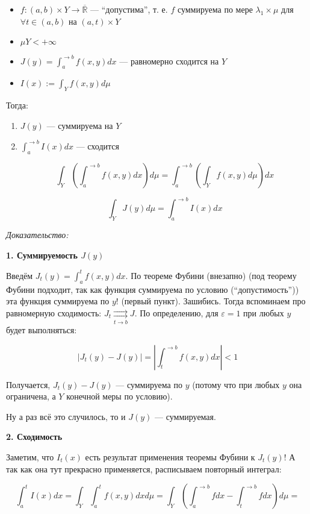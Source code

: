 \documentclass{article}
\def\rsh#1{\underset{#1}{\rightrightarrows}}
\def\rinf{\overline{\mathbb{R}}}
\begin{document}
\begin{itemize}
    \item $f: (a, b) \times Y \rightarrow \rinf$ --- ``допустима'', т. е. $f$ суммируема по мере $\lambda_1 \times \mu$ для $\forall t \in (a, b)$ на $(a, t) \times Y$ 
    \item $\mu Y < +\infty$
    \item $J(y) = \int_a^{\rightarrow b} f(x, y) dx$ --- равномерно сходится на $Y$
    \item $I(x) := \int_{Y} f(x, y) d\mu$
\end{itemize}

Тогда:

\begin{enumerate}
    \item $J(y)$ --- суммируема на $Y$
    \item $\int_a^{\rightarrow b} I(x) dx$ --- сходится
    
    \[\int_{Y} \left( \int_a^{\rightarrow b} f(x, y) dx\right) d\mu = \int_a^{\rightarrow b} \left( \int_{Y} f(x, y) d\mu\right) dx\]

    \[\int_{Y} J(y) d\mu = \int_a^{\rightarrow b} I(x) dx\]
\end{enumerate}

\textit{Доказательство:}

\textbf{1. Суммируемость $J(y)$}

Введём $J_t(y) = \int_a^t f(x, y) dx$. По теореме Фубини (внезапно) (под теорему Фубини подходит, так как функция суммируема по условию (``допустимость'')) эта функция суммируема по $y$! (первый пункт). Зашибись. Тогда вспоминаем про равномерную сходимость: $J_t \rsh{t \rightarrow b} J$. По определению, для $\varepsilon = 1$ при любых $y$ будет выполняться:

\[|J_t(y) - J(y)| = \left| \int_t^{\rightarrow b} f(x, y) dx\right| < 1\]

Получается, $J_t(y) - J(y)$ --- суммируема по $y$ (потому что при любых $y$ она ограничена, а $Y$ конечной меры по условию).

Ну а раз всё это случилось, то и $J(y)$ --- суммируемая.

\textbf{2. Сходимость}

Заметим, что $I_t(x)$ есть результат применения теоремы Фубини к $J_t(y)$! А так как она тут прекрасно применяется, расписываем повторный интеграл:

\[\int_a^t I(x) dx = \int_{Y} \int_a^t f(x, y) dx d\mu = \int_{Y} \left(\int_a^{\rightarrow b} f dx - \int_t^{\rightarrow b} fdx \right) d\mu = \]
\end{document}
